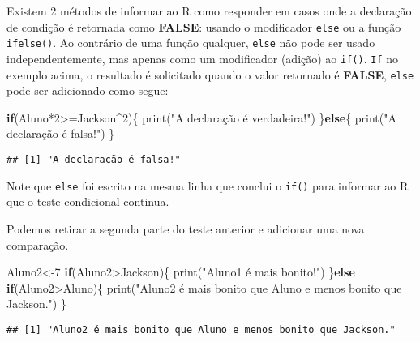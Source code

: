 \documentclass[
]{book}
\newenvironment{Shaded}{\begin{snugshade}}{\end{snugshade}}
\newcommand{\ControlFlowTok}[1]{\textcolor[rgb]{0.13,0.29,0.53}{\textbf{#1}}}
\newcommand{\DecValTok}[1]{\textcolor[rgb]{0.00,0.00,0.81}{#1}}
\newcommand{\FunctionTok}[1]{\textcolor[rgb]{0.00,0.00,0.00}{#1}}
\newcommand{\NormalTok}[1]{#1}
\newcommand{\OtherTok}[1]{\textcolor[rgb]{0.56,0.35,0.01}{#1}}
\newcommand{\SpecialCharTok}[1]{\textcolor[rgb]{0.00,0.00,0.00}{#1}}
\newcommand{\StringTok}[1]{\textcolor[rgb]{0.31,0.60,0.02}{#1}}
\begin{document}
Existem 2 métodos de informar ao R como responder em casos onde a declaração de condição é retornada como \textbf{FALSE}: usando o modificador \texttt{else} ou a função \texttt{ifelse()}.
Ao contrário de uma função qualquer, \texttt{else} não pode ser usado independentemente, mas apenas como um modificador (adição) ao \texttt{if()}. \texttt{If} no exemplo acima, o resultado é solicitado quando o valor retornado é \textbf{FALSE}, \texttt{else} pode ser adicionado como segue:

\begin{Shaded}
\begin{Highlighting}[]
\ControlFlowTok{if}\NormalTok{(Aluno}\SpecialCharTok{*}\DecValTok{2}\SpecialCharTok{\textgreater{}=}\NormalTok{Jackson}\SpecialCharTok{\^{}}\DecValTok{2}\NormalTok{)\{}
    \FunctionTok{print}\NormalTok{(}\StringTok{"A declaração é verdadeira!"}\NormalTok{)}
\NormalTok{  \}}\ControlFlowTok{else}\NormalTok{\{}
    \FunctionTok{print}\NormalTok{(}\StringTok{"A declaração é falsa!"}\NormalTok{)}
\NormalTok{    \}}
\end{Highlighting}
\end{Shaded}

\begin{verbatim}
## [1] "A declaração é falsa!"
\end{verbatim}

Note que \texttt{else} foi escrito na mesma linha que conclui o \texttt{if()} para informar ao R que o teste condicional continua.

Podemos retirar a segunda parte do teste anterior e adicionar uma nova comparação.

\begin{Shaded}
\begin{Highlighting}[]
\NormalTok{Aluno2}\OtherTok{\textless{}{-}}\DecValTok{7}
\ControlFlowTok{if}\NormalTok{(Aluno2}\SpecialCharTok{\textgreater{}}\NormalTok{Jackson)\{}
    \FunctionTok{print}\NormalTok{(}\StringTok{"Aluno1 é mais bonito!"}\NormalTok{)}
\NormalTok{  \}}\ControlFlowTok{else} \ControlFlowTok{if}\NormalTok{(Aluno2}\SpecialCharTok{\textgreater{}}\NormalTok{Aluno)\{}
    \FunctionTok{print}\NormalTok{(}\StringTok{"Aluno2 é mais bonito que Aluno e menos bonito que Jackson."}\NormalTok{)}
\NormalTok{    \}}
\end{Highlighting}
\end{Shaded}

\begin{verbatim}
## [1] "Aluno2 é mais bonito que Aluno e menos bonito que Jackson."
\end{verbatim}
\end{document}
